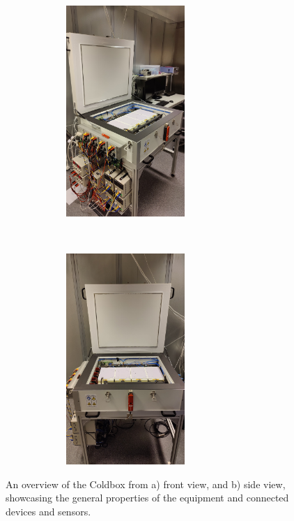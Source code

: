 \begin{figure}[h]
    
    \begin{subfigure}[b]{0.45\textwidth}
        \centering
        \includegraphics[width=7cm,height=8cm,keepaspectratio]{Figures/test/coldbox-1.jpg}
        \caption{}\label{fig:coldbox1}
    \end{subfigure}
    ~
    \begin{subfigure}[b]{0.45\textwidth}
        \centering
        \includegraphics[width=7cm,height=8cm,keepaspectratio]{Figures/test/coldbox-2.jpg}
        \caption{}\label{fig:coldbox2}
    \end{subfigure}
    \caption{An overview of the Coldbox from a) front view, and b) side view, showcasing the general properties of the equipment and connected devices and sensors.}
    \label{fig:coldbox}
\end{figure}

